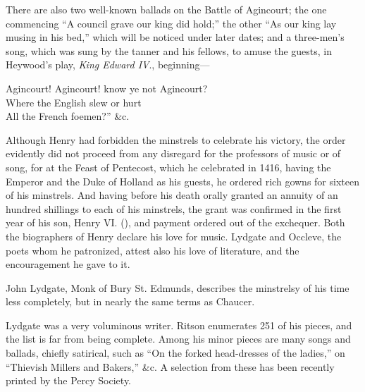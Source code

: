 
\bigskip


There are also two well-known ballads on the Battle of Agincourt; the one
commencing “A council grave our king did hold;” the other “As our king lay
musing in his bed,” which will be noticed under later dates; and a three-men’s
song, which was sung by the tanner and his fellows, to amuse the guests, in
Heywood’s play, \textit{King Edward IV}., beginning—

\begin{scverse}Agincourt! Agincourt! know ye not Agincourt?\\
Where the English slew or hurt\\
\vin All the French foemen?” \&c.
\end{scverse}

Although Henry had forbidden the minstrels to celebrate his victory, the order
evidently did not proceed from any disregard for the professors of music or of
song, for at the Feast of Pentecost, which he celebrated in 1416, having the
Emperor and the Duke of Holland as his guests, he ordered rich gowns for sixteen 
of his minstrels. And having before his \pagebreak
 death orally granted an annuity of an
 hundred shillings to each of his minstrels, the grant was confirmed in the first
year of his son, Henry VI. (), and payment ordered out of the exchequer.
Both the biographers of Henry declare his love for music. Lydgate
and Occleve, the poets whom he patronized, attest also his love of literature, and
the encouragement he gave to it.

John Lydgate, Monk of Bury St. Edmunds, describes the minstrelsy of his
time less completely, but in nearly the same terms as Chaucer.

Lydgate was a very voluminous writer. Ritson enumerates 251 of his pieces,
and the list is far from being complete. Among his minor pieces are many songs
and ballads, chiefly satirical, such as “On the forked head-dresses of the ladies,”
on “Thievish Millers and Bakers,” \&c. A selection from these has been recently
printed by the Percy Society.

